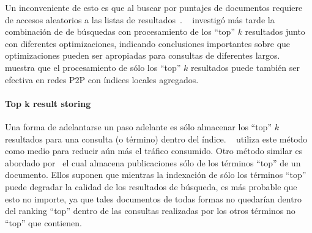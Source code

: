 Un inconveniente de esto es que al buscar por puntajes de documentos requiere
de accesos aleatorios a las listas de resultados~\citealt{suel2003odissea}. %
\citealt{zhang2005efficient}~
investigó más tarde la combinación de de búsquedas con procesamiento de los
``top'' $k$ resultados junto con diferentes optimizaciones, indicando
conclusiones importantes sobre que optimizaciones pueden ser apropiadas para
consultas de diferentes largos.
\citealt{balke2005progressive}~
muestra que el procesamiento de sólo los ``top'' $k$ resultados puede también
ser efectiva en redes P2P con índices locales agregados.


\paragraph{Top k result storing~\cite{tang2004hybrid, skobeltsyn2006distributed, skobeltsyn2009query, skobeltsyn2007query}} %
Una forma de adelantarse un paso adelante es sólo almacenar los ``top'' $k$
resultados para una consulta (o término) dentro del índice.
\citealt{skobeltsyn2006distributed}~%
utiliza este método como medio para reducir aún más el tráfico consumido.
Otro método similar es abordado por~\citealt{tang2004hybrid} %
el cual almacena publicaciones sólo de los términos ``top'' de un documento.
Ellos suponen que mientras la indexación de sólo los términos ``top'' puede
degradar la calidad de los resultados de búsqueda, es más probable que esto no
importe, ya que tales documentos de todas formas no quedarían dentro del ranking ``top''
dentro de las consultas realizadas por los otros términos no ``top'' que contienen.
